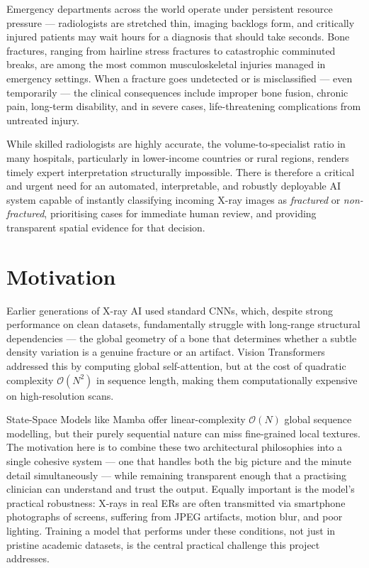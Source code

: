 \documentclass[12pt, a4paper]{article}
\begin{document}
Emergency departments across the world operate under persistent resource pressure — radiologists
are stretched thin, imaging backlogs form, and critically injured patients may wait hours for a
diagnosis that should take seconds. Bone fractures, ranging from hairline stress fractures to
catastrophic comminuted breaks, are among the most common musculoskeletal injuries managed in
emergency settings. When a fracture goes undetected or is misclassified — even temporarily —
the clinical consequences include improper bone fusion, chronic pain, long-term disability, and
in severe cases, life-threatening complications from untreated injury.

While skilled radiologists are highly accurate, the volume-to-specialist ratio in many hospitals,
particularly in lower-income countries or rural regions, renders timely expert interpretation
structurally impossible. There is therefore a critical and urgent need for an automated,
interpretable, and robustly deployable AI system capable of instantly classifying incoming X-ray
images as \emph{fractured} or \emph{non-fractured}, prioritising cases for immediate human
review, and providing transparent spatial evidence for that decision.

\section{Motivation}

Earlier generations of X-ray AI used standard CNNs, which, despite strong performance on clean
datasets, fundamentally struggle with long-range structural dependencies — the global geometry of
a bone that determines whether a subtle density variation is a genuine fracture or an artifact.
Vision Transformers addressed this by computing global self-attention, but at the cost of
quadratic complexity $\mathcal{O}(N^2)$ in sequence length, making them computationally expensive
on high-resolution scans.

State-Space Models like Mamba offer linear-complexity $\mathcal{O}(N)$ global sequence modelling,
but their purely sequential nature can miss fine-grained local textures. The motivation here is to
combine these two architectural philosophies into a single cohesive system — one that handles both
the big picture and the minute detail simultaneously — while remaining transparent enough that a
practising clinician can understand and trust the output. Equally important is the model's
practical robustness: X-rays in real ERs are often transmitted via smartphone photographs of
screens, suffering from JPEG artifacts, motion blur, and poor lighting. Training a model that
performs under these conditions, not just in pristine academic datasets, is the central practical
challenge this project addresses.
\end{document}
